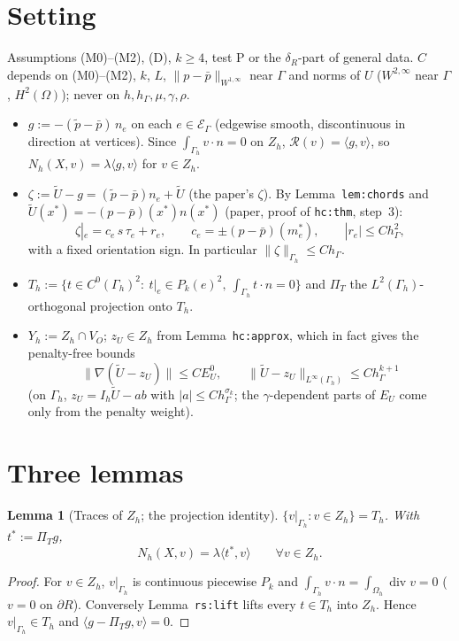 \documentclass[11pt]{article}
\newtheorem{lemma}[theorem]{Lemma}
\theoremstyle{remark}
\newcommand{\hG}{h_\Gamma}
\newcommand{\Gh}{\Gamma_h}
\newcommand{\Oh}{\Omega_h}
\newcommand{\Zh}{Z_h}
\newcommand{\Yh}{Y_h}
\newcommand{\Th}{T_h}
\newcommand{\PT}{\Pi_T}
\newcommand{\norm}[1]{\|#1\|}
\newcommand{\ip}[2]{\langle #1,#2\rangle}
\newcommand{\Ut}{\tilde U}
\newcommand{\pt}{\tilde p}
\newcommand{\pbar}{\bar p}
\newcommand{\EU}{E^{0}_{U}}
\newcommand{\Rc}{\mathcal R}
\newcommand{\EG}{\mathcal E_\Gamma}
\newcommand{\VO}{V_O}
\renewcommand{\div}{\operatorname{div}}
\begin{document}
\section{Setting}
Assumptions (M0)--(M2), (D), $k\ge4$, test P or the $\delta_R$-part of general data. $C$ depends on (M0)--(M2), $k$, $L$, $\norm{p-\pbar}_{W^{1,\infty}}$ near $\Gamma$ and norms of $U$ ($W^{2,\infty}$ near $\Gamma$, $H^2(\Omega)$); never on $h,\hG,\mu,\gamma,\rho$.
\begin{itemize}
\item $g:=-(\pt-\pbar)\,n_e$ on each $e\in\EG$ (edgewise smooth, discontinuous in direction at vertices). Since $\int_{\Gh}v\cdot n=0$ on $\Zh$, $\Rc(v)=\ip{g}{v}$, so $N_h(X,v)=\lambda\ip{g}{v}$ for $v\in\Zh$.
\item $\zeta:=\Ut-g=(\pt-\pbar)n_e+\Ut$ (the paper's $\zeta$). By Lemma~\texttt{lem:chords} and $\Ut(x^\ast)=-(p-\pbar)(x^\ast)n(x^\ast)$ (paper, proof of \texttt{hc:thm}, step~3):
\begin{equation}\label{zeta}
\zeta|_e=c_e\,s\,\tau_e+r_e,\qquad c_e=\pm(p-\pbar)(m_e^\ast),\qquad |r_e|\le C\hG^2,
\end{equation}
with a fixed orientation sign. In particular $\norm\zeta_{\Gh}\le C\hG$.
\item $\Th:=\{t\in C^0(\Gh)^2:\ t|_e\in P_k(e)^2,\ \int_{\Gh}t\cdot n=0\}$ and $\PT$ the $L^2(\Gh)$-orthogonal projection onto $\Th$.
\item $\Yh:=\Zh\cap\VO$; $z_U\in\Zh$ from Lemma~\texttt{hc:approx}, which in fact gives the penalty-free bounds
\begin{equation}\label{zU}
\norm{\nabla(\Ut-z_U)}\le C\EU,\qquad \norm{\Ut-z_U}_{L^\infty(\Gh)}\le C\hG^{k+1}
\end{equation}
(on $\Gh$, $z_U=I_h\Ut-ab$ with $|a|\le C\hG^{\sigma_k}$; the $\gamma$-dependent parts of $E_U$ come only from the penalty weight).
\end{itemize}

\section{Three lemmas}
\begin{lemma}[Traces of $\Zh$; the projection identity]\label{lem:proj}
$\{v|_{\Gh}:v\in\Zh\}=\Th$. With $t^\ast:=\PT g$,
\[
N_h(X,v)=\lambda\ip{t^\ast}{v}\qquad\forall v\in\Zh .
\]
\end{lemma}
\begin{proof}
For $v\in\Zh$, $v|_{\Gh}$ is continuous piecewise $P_k$ and $\int_{\Gh}v\cdot n=\int_{\Oh}\div v=0$ ($v=0$ on $\partial R$). Conversely Lemma~\texttt{rs:lift} lifts every $t\in\Th$ into $\Zh$. Hence $v|_{\Gh}\in\Th$ and $\ip{g-\PT g}{v}=0$.
\end{proof}
\end{document}
